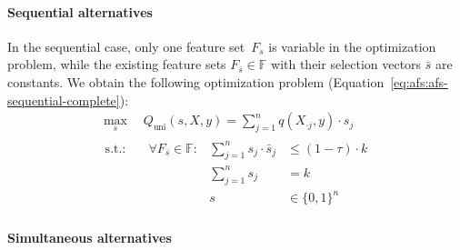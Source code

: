 \documentclass[iicol, sn-basic, Numbered]{sn-jnl} %
\theoremstyle{plain}
\theoremstyle{definition}
\begin{document}
\begin{appendices}
\paragraph{Sequential alternatives}

In the sequential case, only one feature set~$F_s$ is variable in the optimization problem, while the existing feature sets $F_{\bar{s}} \in \mathbb{F}$ with their selection vectors $\bar{s}$ are constants.
We obtain the following optimization problem (Equation~\ref{eq:afs:afs-sequential-complete}):
%
\begin{equation}
	\begin{gathered}
		\max_s \quad Q_{\text{uni}}(s,X,y) = \sum_{j=1}^{n} q(X_{\cdot{}j},y) \cdot s_j \\
		\begin{aligned}
			\text{s.t.:} &\quad \forall F_{\bar{s}} \in \mathbb{F}: & \sum_{j=1}^n s_j \cdot \bar{s}_j &\leq (1 - \tau) \cdot k \\
			&\quad & \sum_{j=1}^n s_j &= k \\
			&\quad & s &\in \{0,1\}^n
		\end{aligned}
	\end{gathered}
	\label{eq:afs:afs-sequential-complete}
\end{equation}
%
\paragraph{Simultaneous alternatives}


\end{appendices}
\end{document}
